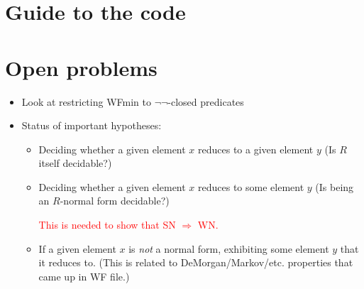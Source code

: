 \documentclass{scrartcl}
\begin{document}
\newpage
\section{Guide to the code}
\section{Open problems}
\begin{itemize}
    \item Look at restricting WFmin to $\lnot\lnot$-closed predicates
    \item Status of important hypotheses:
      \begin{itemize}
        \item Deciding whether a given element $x$ reduces to a given element $y$
        (Is $R$ itself decidable?)
        \item Deciding whether a given element $x$ reduces to some element $y$
        (Is being an $R$-normal form decidable?)
  
        {\textcolor{red}{This is needed to show that SN $\Rightarrow$ WN.}}
  
        \item If a given element $x$ is \emph{not} a normal form,
        exhibiting some element $y$ that it reduces to.
        (This is related to DeMorgan/Markov/etc. properties that came up in WF file.)
  

\end{itemize}
\end{itemize}
\end{document}
